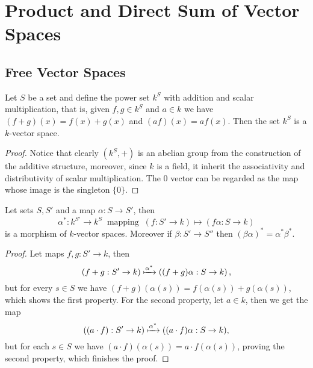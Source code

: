 \section{Product and Direct Sum of Vector Spaces}

\subsection{Free Vector Spaces}

\begin{proposition}
    Let \(S\) be a set and define the power set \(k^S\) with addition and
    scalar multiplication, that is, given \(f, g \in k^S\) and \(a \in k\) we
    have \((f + g)(x) = f(x) + g(x)\) and \((a f)(x) = af(x)\). Then the set
    \(k^S\) is a \(k\)-vector space.
\end{proposition}

\begin{proof}
    Notice that clearly \((k^S, +)\) is an abelian group from the construction of
    the additive structure, moreover, since \(k\) is a field, it inherit the
    associativity and distributivity of scalar multiplication. The \(0\) vector
    can be regarded as the map whose image is the singleton \(\{0\}\).
\end{proof}

\begin{proposition}[Functoriality of \(k^S\)]
    Let sets \(S, S'\) and a map \(\alpha : S \to S'\), then
    \[
        \alpha^\ast : k^{S'} \to k^S \ \text{ mapping }\ (f : S' \to k) \mapsto
        (f  \alpha : S \to k)
    \]
    is a morphism of \(k\)-vector spaces. Moreover if \(\beta : S' \to S''\) then
    \((\beta  \alpha)^\ast = \alpha^\ast  \beta^\ast\).
\end{proposition}

\begin{proof}
    Let maps \(f, g : S' \to k\), then
    \[
        (f + g : S' \to k) \xmapsto{\alpha^\ast} \left( (f + g) \alpha : S
        \to k \right),
    \]
    but for every \(s \in S\) we have \((f + g)(\alpha(s)) = f(\alpha(s)) +
    g(\alpha(s))\), which shows the first property. For the second property, let
    \(a \in k\), then we get the map
    \[
        ((a \cdot f) : S' \to k) \xmapsto{\alpha^\ast} ( (a \cdot f)  \alpha
        : S \to k),
    \]
    but for each \(s \in S\) we have \((a \cdot f)(\alpha(s)) = a \cdot
    f(\alpha(s))\), proving the second property, which finishes the proof.
\end{proof}

